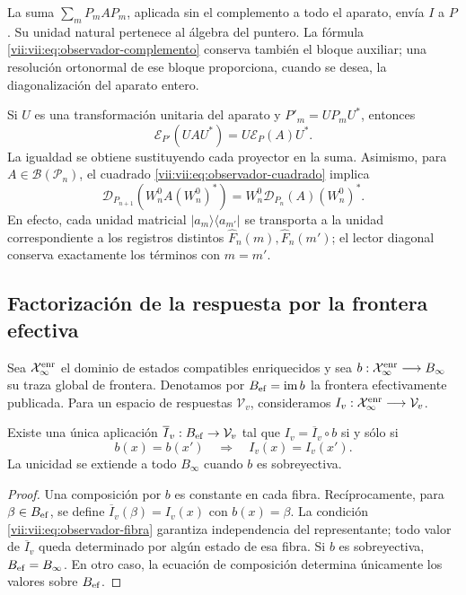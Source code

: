 La suma \(\sum_mP_mAP_m\), aplicada sin el complemento a todo el
aparato, envía \(I\) a \(P\). Su unidad natural pertenece al álgebra
del puntero. La fórmula \eqref{vii:vii:eq:observador-complemento} conserva
también el bloque auxiliar; una resolución ortonormal de ese bloque
proporciona, cuando se desea, la diagonalización del aparato entero.

Si \(U\) es una transformación unitaria del aparato y
\(P'_m=UP_mU^*\), entonces
\[
 \mathcal E_{P'}(UAU^*)=U\mathcal E_P(A)U^*.
\]
La igualdad se obtiene sustituyendo cada proyector en la suma.
Asimismo, para \(A\in\mathcal B(\mathcal P_n)\), el cuadrado
\eqref{vii:vii:eq:observador-cuadrado} implica
\[
 \mathcal D_{P_{n+1}}(W_n^0A(W_n^0)^*)
 =W_n^0\mathcal D_{P_n}(A)(W_n^0)^*.
\]
En efecto, cada unidad matricial \(|a_m\rangle\langle a_{m'}|\)
se transporta a la unidad correspondiente a los registros distintos
\(\widehat F_n(m),\widehat F_n(m')\); el lector diagonal conserva
exactamente los términos con \(m=m'\).

\subsection{Factorización de la respuesta por la frontera efectiva}
\label{vii:vii:sec:observador-factorizacion}

Sea \(\mathcal X_\infty^{\rm enr}\) el dominio de estados compatibles
enriquecidos y sea
\(b:\mathcal X_\infty^{\rm enr}\longrightarrow B_\infty\) su traza
global de frontera. Denotamos por \(B_{\rm ef}=\operatorname{im}b\)
la frontera efectivamente publicada. Para un espacio de respuestas
\(\mathcal V_v\), consideramos
\(I_v:\mathcal X_\infty^{\rm enr}\longrightarrow\mathcal V_v\).

\begin{theorem}
\label{vii:vii:thm:observador-factorizacion}
Existe una única aplicación \(\overline I_v:B_{\rm ef}\to\mathcal V_v\)
tal que \(I_v=\overline I_v\circ b\) si y sólo si
\begin{equation}
 b(x)=b(x')\quad\Longrightarrow\quad I_v(x)=I_v(x').
 \label{vii:vii:eq:observador-fibra}
\end{equation}
La unicidad se extiende a todo \(B_\infty\) cuando \(b\) es
sobreyectiva.
\end{theorem}

\begin{proof}
Una composición por \(b\) es constante en cada fibra. Recíprocamente,
para \(\beta\in B_{\rm ef}\), se define
\(\overline I_v(\beta)=I_v(x)\) con \(b(x)=\beta\).
La condición \eqref{vii:vii:eq:observador-fibra} garantiza independencia
del representante; todo valor de \(\overline I_v\) queda determinado
por algún estado de esa fibra. Si \(b\) es sobreyectiva,
\(B_{\rm ef}=B_\infty\). En otro caso, la ecuación de composición
determina únicamente los valores sobre \(B_{\rm ef}\).
\end{proof}

